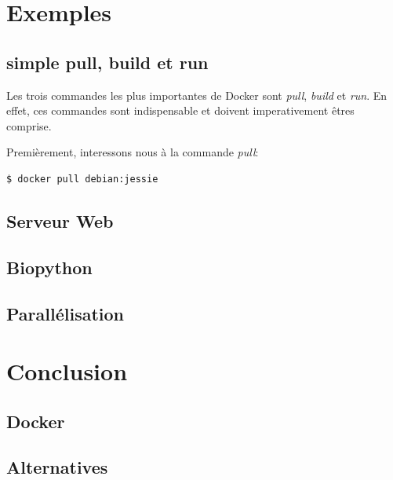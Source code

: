 \section{Exemples}
\subsection{simple pull, build et run}
Les trois commandes les plus importantes de Docker sont \emph{pull}, \emph{build} et \emph{run}. En effet, ces commandes sont indispensable et doivent imperativement êtres comprise.

Premièrement, interessons nous à la commande \emph{pull}:

\begin{lstlisting}[frame=single]
$ docker pull debian:jessie
\end{lstlisting}

\subsection{Serveur Web}
\subsection{Biopython}
\subsection{Parallélisation}

\section{Conclusion}
\subsection{Docker}
\subsection{Alternatives}
































